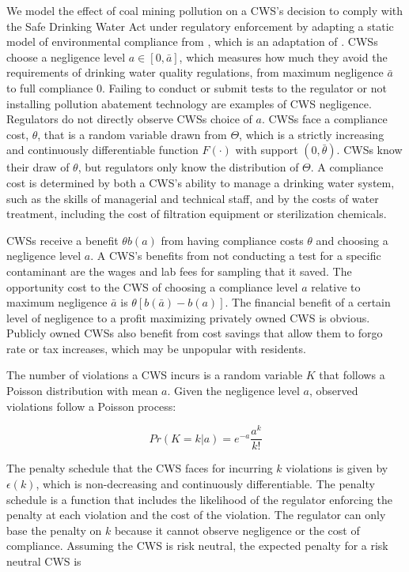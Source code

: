 \documentclass{article}
\begin{document}
We model the effect of coal mining pollution on a CWS's decision to comply with the Safe Drinking Water Act under regulatory enforcement by adapting a static model of environmental compliance from \cite{kang2021understanding}, which is an adaptation of \cite{mookherjee1994marginal}. CWSs choose a negligence level $a \in [0,\bar{a}]$, which measures how much they avoid the requirements of drinking water quality regulations, from maximum negligence $\bar{a}$ to full compliance 0. Failing to conduct or submit tests to the regulator or not installing pollution abatement technology are examples of CWS negligence. Regulators do not directly observe CWSs choice of $a$. CWSs face a compliance cost, $\theta$, that is a random variable drawn from $\Theta$, which is a strictly increasing and continuously differentiable function $F(\cdot)$ with support $(0,\bar{\theta})$. CWSs know their draw of $\theta$, but regulators only know the distribution of $\Theta$. A compliance cost is determined by both a CWS's ability to manage a drinking water system, such as the skills of managerial and technical staff, and by the costs of water treatment, including the cost of filtration equipment or sterilization chemicals.

CWSs receive a benefit $\theta b(a)$ from having compliance costs $\theta$ and choosing a negligence level $a$. A CWS's benefits from not conducting a test for a specific contaminant are the wages and lab fees for sampling that it saved. The opportunity cost to the CWS of choosing a compliance level $a$ relative to maximum negligence $\bar{a}$ is $\theta [b(\bar{a})-b(a)]$. The financial benefit of a certain level of negligence to a profit maximizing privately owned CWS is obvious. Publicly owned CWSs also benefit from cost savings that allow them to forgo rate or tax increases, which may be unpopular with residents.

The number of violations a CWS incurs is a random variable $K$ that follows a Poisson distribution with mean $a$. Given the negligence level $a$, observed violations follow a Poisson process:

\[Pr(K = k | a) = e^{-a}  \frac{a^k}{k!}\]

The penalty schedule that the CWS faces for incurring $k$ violations is given by $\epsilon(k)$, which is non-decreasing and continuously differentiable. The penalty schedule is a function that includes the likelihood of the regulator enforcing the penalty at each violation and the cost of the violation. The regulator can only base the penalty on $k$ because it cannot observe negligence or the cost of compliance. Assuming the CWS is risk neutral, the expected penalty for a risk neutral CWS is 
\end{document}
